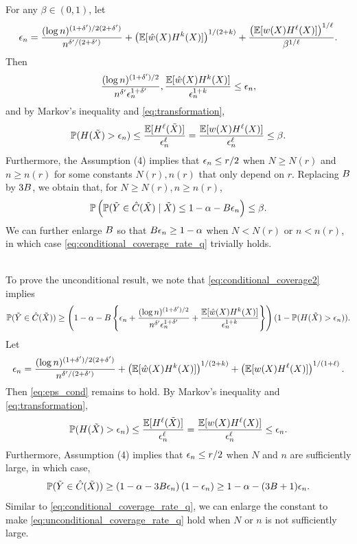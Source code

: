 For any $\beta\in (0, 1)$, let
\[\epsilon_{n} = \frac{(\log n)^{(1 + \delta') / 2(2 + \delta')}}{n^{\delta' / (2 + \delta')}} + \left(\mathbb{E}[\hat{w}(X)H^{k}(X)]\right)^{1 / (2+k)} + \frac{\left(\mathbb{E}[w(X)H^{\ell}(X)]\right)^{1/\ell}}{\beta^{1/\ell}}.\]
Then
\begin{equation}
  \label{eq:eps_cond}
  \frac{(\log n)^{(1 + \delta') / 2}}{n^{\delta'}\epsilon_{n}^{1 + \delta'}}, \frac{\mathbb{E}[\hat{w}(X)H^{k}(X)]}{\epsilon_{n}^{1+k}}\le \epsilon_{n},
\end{equation}
and by Markov's inequality and \eqref{eq:transformation},
\[\mathbb{P}(H(\tilde{X}) > \epsilon_{n})\le \frac{\mathbb{E}[H^{\ell}(\tilde{X})]}{\epsilon_{n}^{\ell}} = \frac{\mathbb{E}[w(X)H^{\ell}(X)]}{\epsilon_{n}^{\ell}}\le \beta.\]
Furthermore, the Assumption (4) implies that $\epsilon_{n}\le r / 2$ when $N\ge N(r)$ and $n\ge n(r)$ for some constants $N(r), n(r)$ that only depend on $r$. Replacing $B$ by $3B$, we obtain that, for $N\ge N(r), n\ge n(r)$, 
\[\mathbb{P}\left(\mathbb{P}(\tilde{Y} \in \hat{C}(\tilde{X}) \mid \tilde{X}) \le 1 - \alpha - B\epsilon_{n}\right)\le \beta.\]
We can further enlarge $B$ so that $B\epsilon_{n} \ge 1 - \alpha$ when $N < N(r)$ or $n < n(r)$, in which case \eqref{eq:conditional_coverage_rate_q} trivially holds.

~\\
\noindent To prove the unconditional result, we note that \eqref{eq:conditional_coverage2} implies
\[\mathbb{P}(\tilde{Y} \in \hat{C}(\tilde{X}))\ge \left( 1 - \alpha - B\left\{\epsilon_{n} + \frac{(\log n)^{(1 + \delta') / 2}}{n^{\delta'}\epsilon_{n}^{1 + \delta'}} + \frac{\mathbb{E}[\hat{w}(X)H^{k}(X)]}{\epsilon_{n}^{1+k}}\right\}\right)(1 - \mathbb{P}(H(\tilde{X}) > \epsilon_{n})).\]
Let
\[\epsilon_{n} = \frac{(\log n)^{(1 + \delta') / 2(2 + \delta')}}{n^{\delta' / (2 + \delta')}} + \left(\mathbb{E}[\hat{w}(X)H^{k}(X)]\right)^{1 / (2+k)} + \left(\mathbb{E}[w(X)H^{\ell}(X)]\right)^{1/ (1+\ell)}.\]
Then \eqref{eq:eps_cond} remains to hold. %
By Markov's inequality and \eqref{eq:transformation},
\[\mathbb{P}(H(\tilde{X}) > \epsilon_{n})\le \frac{\mathbb{E}[H^{\ell}(\tilde{X})]}{\epsilon_{n}^{\ell}} = \frac{\mathbb{E}[w(X)H^{\ell}(X)]}{\epsilon_{n}^{\ell}}\le \epsilon_{n}.\]
Furthermore, Assumption (4) implies that $\epsilon_{n}\le r / 2$ when $N$ and $n$ are sufficiently large, in which case,
\[\mathbb{P}(\tilde{Y} \in \hat{C}(\tilde{X}))\ge \left( 1 - \alpha - 3B\epsilon_{n}\right)(1 - \epsilon_{n})\ge 1 - \alpha - (3B+1)\epsilon_{n}.\]
Similar to \eqref{eq:conditional_coverage_rate_q}, we can enlarge the constant to make \eqref{eq:unconditional_coverage_rate_q} hold %
when $N$ or $n$ is not sufficiently large.


